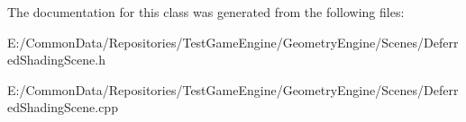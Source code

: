 The documentation for this class was generated from the following files\+:\begin{DoxyCompactItemize}
\item 
E\+:/\+Common\+Data/\+Repositories/\+Test\+Game\+Engine/\+Geometry\+Engine/\+Scenes/Deferred\+Shading\+Scene.\+h\item 
E\+:/\+Common\+Data/\+Repositories/\+Test\+Game\+Engine/\+Geometry\+Engine/\+Scenes/Deferred\+Shading\+Scene.\+cpp\end{DoxyCompactItemize}
